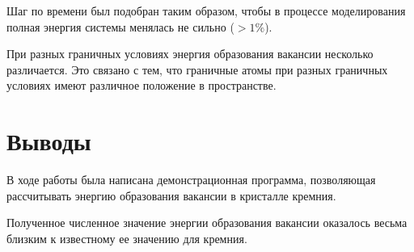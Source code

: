 \documentclass[12pt,a4paper]{article}
\begin{document}
        Шаг по времени был подобран таким образом, чтобы в процессе моделирования полная энергия системы менялась не сильно ($>1\%$).

        При разных граничных условиях энергия образования вакансии несколько различается. Это связано с тем, что граничные атомы при разных граничных условиях имеют различное положение в пространстве.


    \section{Выводы}

        В ходе работы была написана демонстрационная программа, позволяющая рассчитывать энергию образования вакансии в кристалле кремния.

        Полученное численное значение энергии образования вакансии оказалось весьма близким к известному ее значению для кремния.


    \clearpage


    \nocite{*}
    
    
\end{document}
